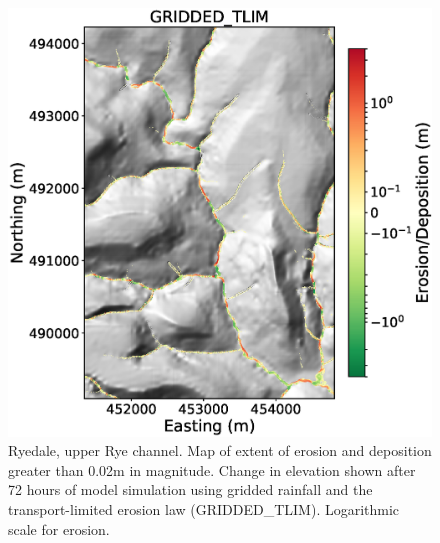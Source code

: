 %

\begin{figure}[htb]
\includegraphics[width=16cm]{chp06_figures_scripts/figure_ryedale_elev_diff_grid_tlim_UPPER.eps}
\caption{Ryedale, upper Rye channel. Map of extent of erosion and deposition greater than 0.02m in magnitude. Change in elevation shown after 72 hours of model simulation using gridded rainfall and the transport-limited erosion law (GRIDDED\_TLIM). Logarithmic scale for erosion.}
\label{fig_ryedale_erodediff_UPPER_gridded_tlim}
\end{figure}

